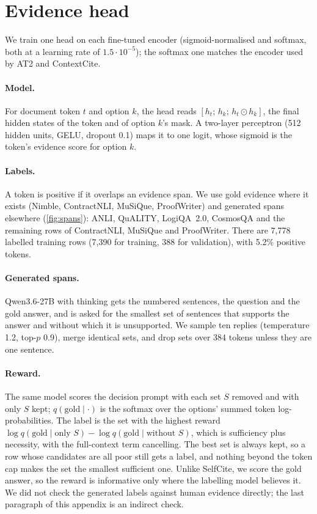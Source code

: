 \section{Evidence head}
\label{app:evidence}

We train one head on each fine-tuned encoder (sigmoid-normalised and softmax, both at a learning rate of $1.5\cdot10^{-5}$); the softmax one matches the encoder used by AT2 and ContextCite.

\paragraph{Model.}
For document token $t$ and option $k$, the head reads $[h_t;\,h_k;\,h_t\odot h_k]$, the final hidden states of the token and of option $k$'s mask.
A two-layer perceptron (512 hidden units, GELU, dropout 0.1) maps it to one logit, whose sigmoid is the token's evidence score for option $k$.

\paragraph{Labels.}
A token is positive if it overlaps an evidence span.
We use gold evidence where it exists (Nimble, ContractNLI, MuSiQue, ProofWriter) and generated spans elsewhere (\cref{fig:spans}): ANLI, QuALITY, LogiQA~2.0, CosmosQA and the remaining rows of ContractNLI, MuSiQue and ProofWriter.
There are 7{,}778 labelled training rows (7{,}390 for training, 388 for validation), with 5.2\% positive tokens.

\paragraph{Generated spans.}
Qwen3.6-27B with thinking gets the numbered sentences, the question and the gold answer, and is asked for the smallest set of sentences that supports the answer and without which it is unsupported.
We sample ten replies (temperature 1.2, top-$p$ 0.9), merge identical sets, and drop sets over 384 tokens unless they are one sentence.

\paragraph{Reward.}
The same model scores the decision prompt with each set $S$ removed and with only $S$ kept; $q(\mathrm{gold}\mid\cdot)$ is the softmax over the options' summed token log-probabilities.
The label is the set with the highest reward $\log q(\mathrm{gold}\mid\text{only }S)-\log q(\mathrm{gold}\mid\text{without }S)$, which is sufficiency plus necessity, with the full-context term cancelling.
The best set is always kept, so a row whose candidates are all poor still gets a label, and nothing beyond the token cap makes the set the smallest sufficient one.
Unlike SelfCite, we score the gold answer, so the reward is informative only where the labelling model believes it.
We did not check the generated labels against human evidence directly; the last paragraph of this appendix is an indirect check.

